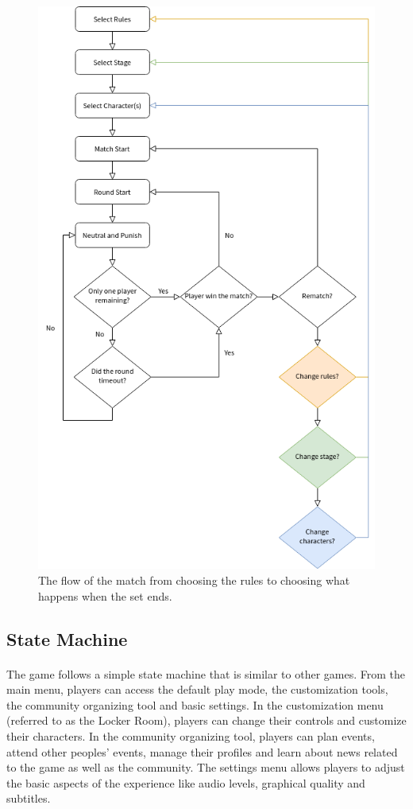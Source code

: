 \begin{figure}[h!]
    \centering
    \includegraphics[width=.75\linewidth]{images/flow-match.png}
    \caption{The flow of the match from choosing the rules to choosing what happens when the set ends.}
\end{figure}

\subsection{State Machine}

\paragraph{} The game follows a simple state machine that is similar to other games. From the main menu, players can access the default play mode, the customization tools, the community organizing tool and basic settings. In the customization menu (referred to as the Locker Room), players can change their controls and customize their characters. In the community organizing tool, players can plan events, attend other peoples' events, manage their profiles and learn about news related to the game as well as the community. The settings menu allows players to adjust the basic aspects of the experience like audio levels, graphical quality and subtitles.

